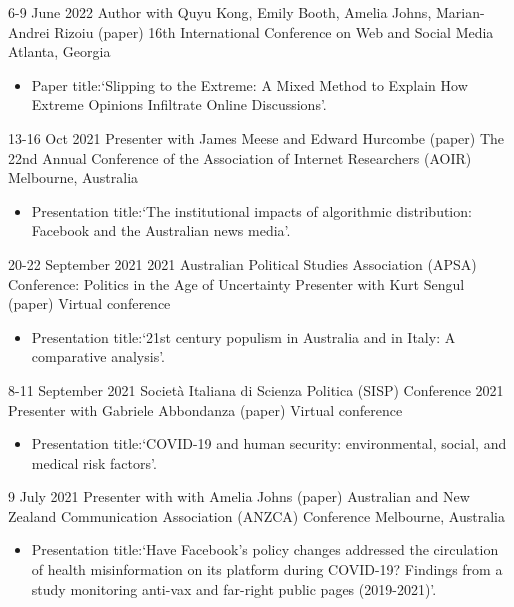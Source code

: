 \documentclass[11pt,a4paper,sans]{moderncv}
\begin{document}
\cventry %
{6-9 June 2022}
{Author with Quyu Kong, Emily Booth, Amelia Johns, Marian-Andrei Rizoiu (paper)}
{16th International Conference on Web and Social Media}
{Atlanta, Georgia}
{}
       {
      \begin{itemize} %
        \item {Paper title:`Slipping to the {Extreme}: {A} {Mixed} {Method} to {Explain} {How} {Extreme} {Opinions} {Infiltrate} {Online} {Discussions}'.}
      \end{itemize}
    }
    
\cventry %
{13-16 Oct 2021}
{Presenter with James Meese and Edward Hurcombe (paper)}
{The 22nd Annual Conference of the Association of Internet Researchers
  (AOIR)}
{Melbourne, Australia}
{}
       {
      \begin{itemize} %
        \item {Presentation title:`The institutional impacts of algorithmic distribution: Facebook and the Australian news media'.}
      \end{itemize}
    }

\cventry %
{20-22 September 2021}
{2021 Australian Political Studies Association (APSA) Conference: Politics in the Age of Uncertainty}
{Presenter with Kurt Sengul (paper)}
{Virtual conference}
{}
       {
      \begin{itemize} %
        \item {Presentation title:`21st century populism in Australia and in Italy: A comparative analysis'.}
      \end{itemize}
    }

 \cventry
    {8-11 September 2021}
    {Società Italiana di Scienza Politica (SISP) Conference 2021}
    {Presenter with Gabriele Abbondanza (paper)}
    {Virtual conference}
{}
       {
      \begin{itemize} %
        \item {Presentation title:`COVID-19 and human security: environmental, social, and medical risk factors'.}
      \end{itemize}
    }


\cventry %
{9 July 2021}
{Presenter with with Amelia Johns (paper)}
{Australian and New Zealand Communication Association (ANZCA) Conference}
{Melbourne, Australia}
{}
       {
      \begin{itemize} %
        \item {Presentation title:`Have Facebook's policy changes
            addressed the circulation of health misinformation on its
            platform during COVID-19? Findings from a study monitoring
            anti-vax and far-right public pages (2019-2021)'.}
      \end{itemize}
    }
\end{document}
